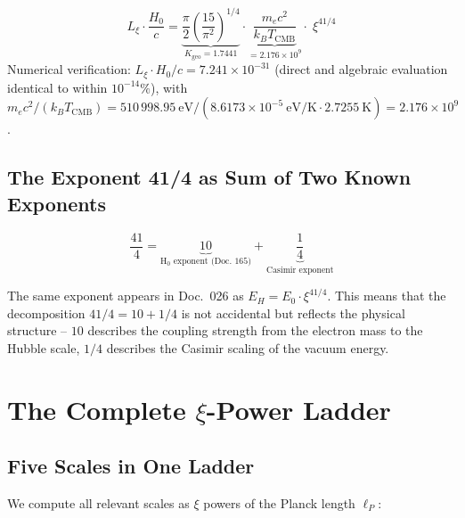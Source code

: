 \begin{keyresult}
    \begin{equation}
        L_\xi \cdot \frac{H_0}{c}
        = \underbrace{\frac{\pi}{2}\left(\frac{15}{\pi^2}\right)^{1/4}}_{K_\text{geo} = 1.7441}
        \cdot
        \underbrace{\frac{m_e c^2}{k_B T_\text{CMB}}}_{= 2.176 \times 10^9}
        \cdot\; \xi^{41/4}
        \label{eq:bridge_boxed}
    \end{equation}
    Numerical verification: $L_\xi \cdot H_0/c = 7.241 \times 10^{-31}$
    (direct and algebraic evaluation identical to within $10^{-14}\%$), with
    $m_ec^2/(k_BT_\text{CMB}) = 510\,998.95~\text{eV}/(8.6173\times10^{-5}~\text{eV/K}\cdot 2.7255~\text{K}) = 2.176\times10^9$.
\end{keyresult}

\subsection{The Exponent 41/4 as Sum of Two Known Exponents}

\begin{equation}
    \frac{41}{4} = \underbrace{10}_{\text{H}_0\text{ exponent (Doc.~165)}}
                 + \underbrace{\frac{1}{4}}_{\text{Casimir exponent}}
    \label{eq:exponent_decomp}
\end{equation}

The same exponent appears in Doc.~026 as $E_H = E_0 \cdot \xi^{41/4}$.
This means that the decomposition $41/4 = 10 + 1/4$ is not accidental but
reflects the physical structure -- $10$ describes the
coupling strength from the electron mass to the Hubble scale, $1/4$ describes
the Casimir scaling of the vacuum energy.

\section{The Complete \texorpdfstring{$\xi$}{xi}-Power Ladder}
\label{sec:ladder}

\subsection{Five Scales in One Ladder}

We compute all relevant scales as $\xi$ powers of the Planck length $\ell_P$:

